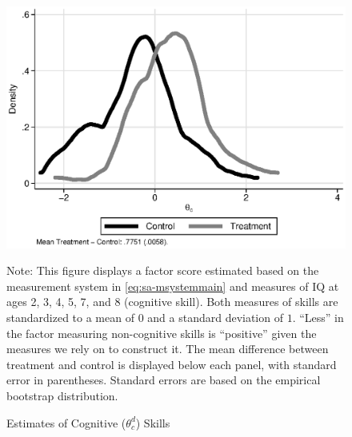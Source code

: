 \documentclass[static]{JJH-Beamer}
\begin{document}
\begin{frame}
 \addtocounter{framenumber}{-1}

\begin{figure}[H]
\caption{Estimates of Cognitive ($\theta_{c}^d$) Skills}\label{figure:factorsm}
\begin{center}
\includegraphics[width=.65\textwidth]{output/abccare_cfactor.eps}
\end{center}
\tiny \flushleft Note: This figure displays a factor score estimated based on the measurement system in \eqref{eq:sa-msystemmain} and measures of IQ at ages 2, 3, 4, 5, 7, and 8 (cognitive skill). Both measures of skills are standardized to a mean of $0$ and a standard deviation of $1$. ``Less'' in the factor measuring non-cognitive skills is ``positive'' given the measures we rely on to construct it. The mean difference between treatment and control is displayed below each panel, with standard error in parentheses. Standard errors are based on the empirical bootstrap distribution.\\
\end{figure}

\end{frame}
\end{document}
